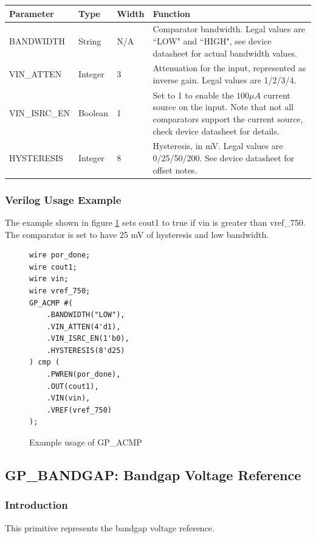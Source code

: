 \documentclass{article}
\begin{document}
\begin{tabularx}{5in}{|l|l|l|X|}
\hline
{\bfseries Parameter} & {\bfseries Type} & {\bfseries Width} & {\bfseries Function} \\
\hline
BANDWIDTH & String & N/A &
	Comparator bandwidth. Legal values are ``LOW" and ``HIGH", see device datasheet for actual bandwidth values. \\
\hline
VIN\_ATTEN & Integer & 3 &
	Attenuation for the input, represented as inverse gain. Legal values are 1/2/3/4. \\
\hline
VIN\_ISRC\_EN & Boolean & 1 &
	Set to 1 to enable the $100 \mu A$ current source on the input. Note that not all comparators support the current
	source, check device datasheet for details.\\
\hline
HYSTERESIS & Integer & 8 &
	Hysteresis, in mV. Legal values are 0/25/50/200. See device datasheet for offset notes.\\
\hline
\end{tabularx}

\pagebreak
\subsubsection{Verilog Usage Example}

The example shown in figure \ref{gp-acmp-example} sets cout1 to true if vin is greater than vref\_750. The comparator is 
set to have 25 mV of hysteresis and low bandwidth.

\begin{figure}[h]
\begin{lstlisting}
wire por_done;
wire cout1;
wire vin;
wire vref_750;
GP_ACMP #(
	.BANDWIDTH("LOW"),
	.VIN_ATTEN(4'd1),
	.VIN_ISRC_EN(1'b0),
	.HYSTERESIS(8'd25)
) cmp (
	.PWREN(por_done),
	.OUT(cout1),
	.VIN(vin),
	.VREF(vref_750)
);
\end{lstlisting}
\caption{Example usage of GP\_ACMP}
\label{gp-acmp-example}
\end{figure}


\pagebreak
\clearpage
\subsection{GP\_BANDGAP: Bandgap Voltage Reference}

\subsubsection{Introduction}
This primitive represents the bandgap voltage reference.
\end{document}
